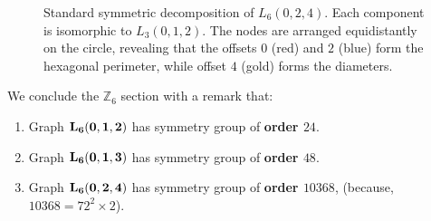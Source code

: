 \documentclass[12pt,letterpaper]{amsart}
\begin{document}
\begin{figure}[H]
    \caption{Standard symmetric decomposition of $L_6(0,2,4)$. Each component is isomorphic to $L_3(0,1,2)$. The nodes are arranged equidistantly on the circle, revealing that the offsets $0$ (red) and $2$ (blue) form the hexagonal perimeter, while offset $4$ (gold) forms the diameters.}
    \label{fig:L6_split_symmetric}
\end{figure}
We conclude the $\mathbb{Z}_6$ section with a remark that:
\begin{enumerate}
\item Graph ${\bf L_6(0,1,2)}$ has symmetry group of {\bf order $24$}.
\item Graph ${\bf L_6(0,1,3)}$ has symmetry group of {\bf order $48$}.
 \item Graph ${\bf L_6(0,2,4)}$ has symmetry group of {\bf order $10368$}, (because, $10368=72^2\times 2$).
  \end{enumerate}
\end{document}
